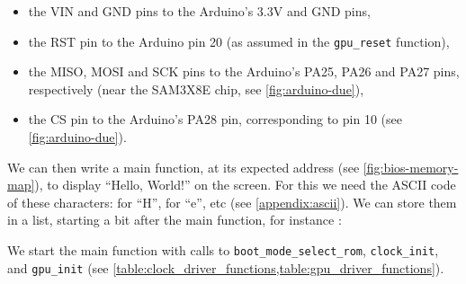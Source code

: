 \begin{itemize}
  \item the VIN and GND pins to the Arduino's 3.3V and GND pins,

  \item the RST pin to the Arduino pin 20 (as assumed in the \verb!gpu_reset!
  function),

  \item the MISO, MOSI and SCK pins to the Arduino's PA25, PA26 and
  PA27 pins, respectively (near the SAM3X8E chip, see \cref{fig:arduino-due}),

  \item the CS pin to the Arduino's PA28 pin, corresponding to pin 10 (see
  \cref{fig:arduino-due}).
\end{itemize}


We can then write a main function, at its expected address
 (see \cref{fig:bios-memory-map}), to display ``Hello,
World!'' on the screen. For this we need the ASCII code of these characters:
 for ``H'',  for ``e'', etc (see \cref{appendix:ascii}). We
can store them in a list, starting a bit after the main function, for instance
:


We start the main function with calls to \verb!boot_mode_select_rom!,
\verb!clock_init!, and \verb!gpu_init! (see
\cref{table:clock_driver_functions,table:gpu_driver_functions}).

\begin{TwoColumns}
\end{TwoColumns}

